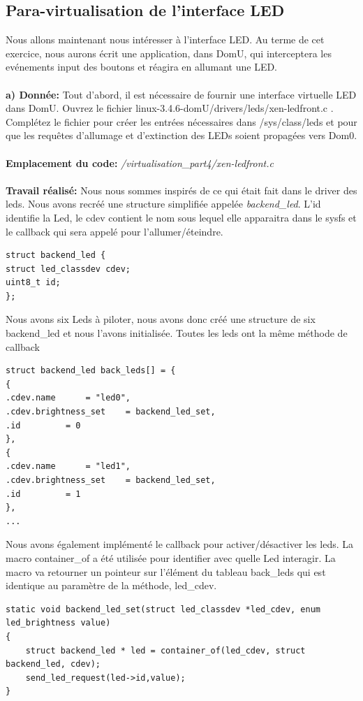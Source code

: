\subsection{Para-virtualisation de l'interface LED}
Nous allons maintenant nous intéresser à l’interface LED. Au terme de cet exercice, nous aurons écrit
une application, dans DomU, qui interceptera les evénements input des boutons et réagira en allumant
une LED.\\\\
\textbf{a) Donnée: }Tout d’abord, il est nécessaire de fournir une interface virtuelle LED dans DomU. Ouvrez le
fichier linux-3.4.6-domU/drivers/leds/xen-ledfront.c . Complétez le fichier pour créer les entrées
nécessaires dans /sys/class/leds et pour que les requêtes d’allumage et d’extinction des LEDs
soient propagées vers Dom0.\\\\
\textbf{Emplacement du code: }\textit{/virtualisation\_part4/xen-ledfront.c}\\\\
\textbf{Travail réalisé: }Nous nous sommes inspirés de ce qui était fait dans le driver des leds. Nous avons recréé une structure simplifiée appelée \textit{backend\_led}. L'id identifie la Led, le cdev contient le nom sous lequel elle apparaitra dans le sysfs et le callback qui sera appelé pour l'allumer/éteindre.
\begin{lstlisting}
struct backend_led {
struct led_classdev cdev;
uint8_t id;
};
\end{lstlisting}
Nous avons six Leds à piloter, nous avons donc créé une structure de six backend\_led et nous l'avons initialisée. Toutes les leds ont la même méthode de callback
\begin{lstlisting}
struct backend_led back_leds[] = {
{
.cdev.name		= "led0",
.cdev.brightness_set 	= backend_led_set,
.id			= 0
},
{
.cdev.name		= "led1",
.cdev.brightness_set 	= backend_led_set,
.id			= 1
},
...
\end{lstlisting}
Nous avons également implémenté le callback pour activer/désactiver les leds. La macro container\_of a été utilisée pour identifier avec quelle Led interagir. La macro va retourner un pointeur sur l'élément du tableau back\_leds qui est identique au paramètre de la méthode, led\_cdev.
\begin{lstlisting}
static void backend_led_set(struct led_classdev *led_cdev, enum led_brightness value)
{
	struct backend_led * led = container_of(led_cdev, struct backend_led, cdev);
	send_led_request(led->id,value);
}
\end{lstlisting}
